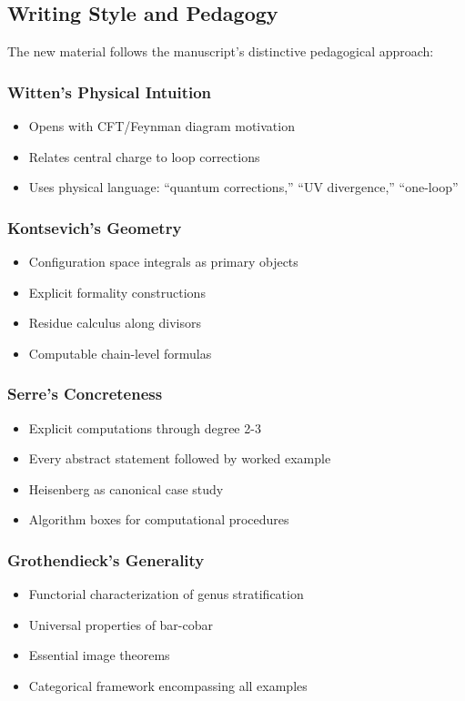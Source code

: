 \subsection{Writing Style and Pedagogy}

The new material follows the manuscript's distinctive pedagogical approach:

\subsubsection{Witten's Physical Intuition}
\begin{itemize}
\item Opens with CFT/Feynman diagram motivation
\item Relates central charge to loop corrections
\item Uses physical language: ``quantum corrections,'' ``UV divergence,'' ``one-loop''
\end{itemize}

\subsubsection{Kontsevich's Geometry}
\begin{itemize}
\item Configuration space integrals as primary objects
\item Explicit formality constructions
\item Residue calculus along divisors
\item Computable chain-level formulas
\end{itemize}

\subsubsection{Serre's Concreteness}
\begin{itemize}
\item Explicit computations through degree 2-3
\item Every abstract statement followed by worked example
\item Heisenberg as canonical case study
\item Algorithm boxes for computational procedures
\end{itemize}

\subsubsection{Grothendieck's Generality}
\begin{itemize}
\item Functorial characterization of genus stratification
\item Universal properties of bar-cobar
\item Essential image theorems
\item Categorical framework encompassing all examples
\end{itemize}

